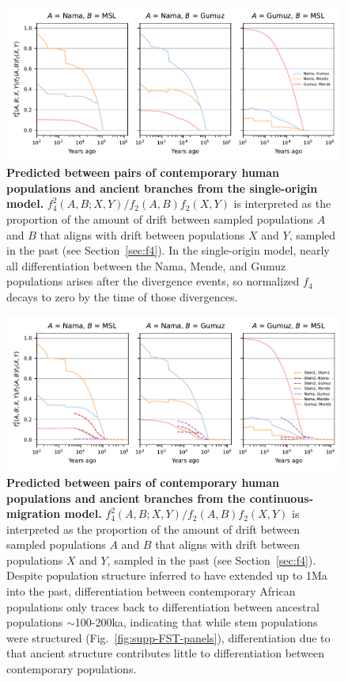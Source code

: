 \documentclass[]{article}
\begin{document}
\begin{figure}[ht]
    \centering
    \includegraphics{figures/supp-f4s-single-origin.pdf}
    \caption{
        \textbf{Predicted  between pairs of contemporary human populations
        and ancient branches from the single-origin model.}
        $f_4^2(A, B; X, Y)/f_2(A, B)f_2(X, Y)$ is interpreted as the proportion of the
        amount of drift between sampled populations $A$ and $B$ that aligns with
        drift between populations $X$ and $Y$, sampled in the past
        (see Section~\ref{sec:f4}). In the single-origin model, nearly all
        differentiation between the Nama, Mende, and Gumuz populations arises
        after the divergence events, so normalized $f_4$ decays to zero by the
        time of those divergences.
    }
    \label{fig:supp-f4s-single-origin}
\end{figure}

\begin{figure}[ht]
    \centering
    \includegraphics{figures/supp-f4s-continuous-migration.pdf}
    \caption{
        \textbf{Predicted  between pairs of contemporary human populations
        and ancient branches from the continuous-migration model.} 
        $f_4^2(A, B; X, Y)/f_2(A, B)f_2(X, Y)$ is interpreted as the proportion of the
        amount of drift between sampled populations $A$ and $B$ that aligns with
        drift between populations $X$ and $Y$, sampled in the past
        (see Section~\ref{sec:f4}).
        Despite population structure inferred to have extended up to 1Ma
        into the past, differentiation between contemporary African populations
        only traces back to differentiation between ancestral populations
        $\sim$100-200ka, indicating that while stem populations were structured
        (Fig.~\ref{fig:supp-FST-panels}), differentiation due to that
        ancient structure contributes little to differentiation between contemporary
        populations.
    }
    \label{fig:supp-f4s-continuous-migration}
\end{figure}
\end{document}
